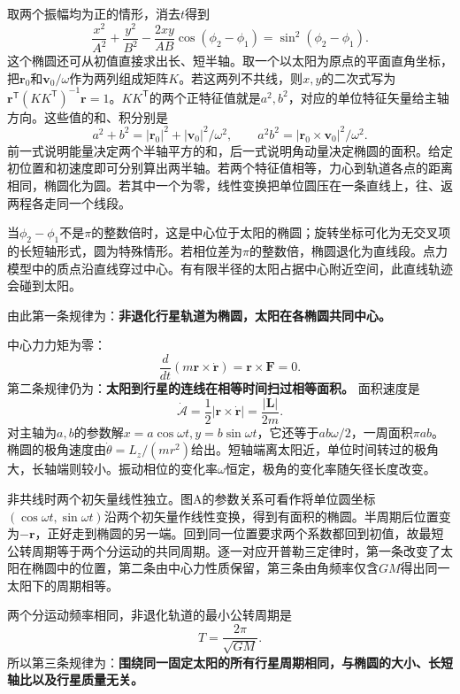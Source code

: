 \documentclass[UTF8,fontset=fandol,a4paper,11pt]{ctexart}
\begin{document}
取两个振幅均为正的情形，消去$t$得到
\[
\boxed{\frac{x^2}{A^2}+\frac{y^2}{B^2}
-\frac{2xy}{AB}\cos(\phi_2-\phi_1)
=\sin^2(\phi_2-\phi_1)}.
\]
这个椭圆还可从初值直接求出长、短半轴。取一个以太阳为原点的平面直角坐标，把$\boldsymbol r_0$和$\boldsymbol v_0/\omega$作为两列组成矩阵$K$。若这两列不共线，则$x,y$的二次式写为$\boldsymbol r^{\mathsf T}(KK^{\mathsf T})^{-1}\boldsymbol r=1$。$KK^{\mathsf T}$的两个正特征值就是$a^2,b^2$，对应的单位特征矢量给主轴方向。这些值的和、积分别是
\[
a^2+b^2=|\boldsymbol r_0|^2+|\boldsymbol v_0|^2/\omega^2,\qquad
a^2b^2=|\boldsymbol r_0\times\boldsymbol v_0|^2/\omega^2.
\]
前一式说明能量决定两个半轴平方的和，后一式说明角动量决定椭圆的面积。给定初位置和初速度即可分别算出两半轴。若两个特征值相等，力心到轨道各点的距离相同，椭圆化为圆。若其中一个为零，线性变换把单位圆压在一条直线上，往、返两程各走同一个线段。

当$\phi_2-\phi_1$不是$\pi$的整数倍时，这是中心位于太阳的椭圆；旋转坐标可化为无交叉项的长短轴形式，圆为特殊情形。若相位差为$\pi$的整数倍，椭圆退化为直线段。点力模型中的质点沿直线穿过中心。有有限半径的太阳占据中心附近空间，此直线轨迹会碰到太阳。

由此第一条规律为：\textbf{非退化行星轨道为椭圆，太阳在各椭圆共同中心。}


中心力力矩为零：
\[
\frac d{dt}\left(m\boldsymbol r\times\dot{\boldsymbol r}\right)
=\boldsymbol r\times\boldsymbol F=0.
\]
第二条规律仍为：\textbf{太阳到行星的连线在相等时间扫过相等面积。}
面积速度是
\[
\dot{\mathcal A}
=\frac12|\boldsymbol r\times\dot{\boldsymbol r}|
=\frac{|\boldsymbol L|}{2m}.
\]
对主轴为$a,b$的参数解$x=a\cos\omega t,y=b\sin\omega t$，它还等于$ab\omega/2$，一周面积$\pi ab$。椭圆的极角速度由$\dot\theta=L_z/(mr^2)$给出。短轴端离太阳近，单位时间转过的极角大，长轴端则较小。振动相位的变化率$\omega$恒定，极角的变化率随矢径长度改变。

非共线时两个初矢量线性独立。图A的参数关系可看作将单位圆坐标$(\cos\omega t,\sin\omega t)$沿两个初矢量作线性变换，得到有面积的椭圆。半周期后位置变为$-\boldsymbol r$，正好走到椭圆的另一端。回到同一位置要求两个系数都回到初值，故最短公转周期等于两个分运动的共同周期。逐一对应开普勒三定律时，第一条改变了太阳在椭圆中的位置，第二条由中心力性质保留，第三条由角频率仅含$GM$得出同一太阳下的周期相等。

两个分运动频率相同，非退化轨道的最小公转周期是
\[
\boxed{T=\frac{2\pi}{\sqrt{GM}}}.
\]
所以第三条规律为：\textbf{围绕同一固定太阳的所有行星周期相同，与椭圆的大小、长短轴比以及行星质量无关。}
\end{document}

